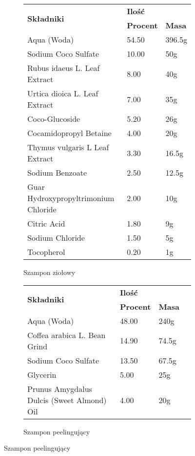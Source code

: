 {\renewcommand{\figurename}{\textbf{Tabela}}
\begin{figure}[H]
\centering
	\caption{(a) i (b) składy poszczególnych szamponów. (c), (d) i (e) składy poszczególnych odżywek}
\begin{footnotesize}
	\begin{subfigure}[t]{0.45\textwidth}
		\centering
		\caption{Szampon ziołowy}
		\begin{tabular}{p{}ll}
			\hline
			\multirow{2}{*}{\textbf{Składniki}} & \multicolumn{2}{l}{\textbf{Ilość}} \\
			\cline{2-3}
			& \textbf{Procent} & \textbf{Masa} \\
			\hline\hline
			Aqua (Woda) & 54.50 & 396.5g  \\
			Sodium Coco Sulfate & 10.00 & 50g  \\
			Rubus idaeus L. Leaf Extract & 8.00 & 40g  \\
			Urtica dioica L. Leaf Extract & 7.00 & 35g  \\
			Coco-Glucoside & 5.20 & 26g  \\
			Cocamidopropyl Betaine & 4.00 & 20g  \\
			Thymus vulgaris L Leaf Extract & 3.30 & 16.5g  \\
			Sodium Benzoate & 2.50 & 12.5g  \\
			Guar Hydroxypropyltrimonium Chloride & 2.00 & 10g  \\
			Citric Acid & 1.80 & 9g  \\
			Sodium Chloride & 1.50 & 5g  \\
			Tocopherol & 0.20 & 1g  \\
			\hline
		\end{tabular}
	\end{subfigure}
	\begin{subfigure}[t]{0.5\textwidth}
		\centering
		\caption{Szampon peelingujący}
		\begin{tabular}{p{}lll}
			\hline
			\multirow{2}{*}{\textbf{Składniki}} & \multicolumn{2}{l}{\textbf{Ilość}} \\
			\cline{2-3}
			& \textbf{Procent} & \textbf{Masa}  \\
			\hline\hline
			Aqua (Woda) & 48.00 & 240g  \\
			Coffea arabica L. Bean Grind & 14.90 & 74.5g  \\
			Sodium Coco Sulfate & 13.50 & 67.5g  \\
			Glycerin & 5.00 & 25g  \\
			Prunus Amygdalus Dulcis (Sweet Almond) Oil & 4.00 & 20g  \\

\end{tabular}
\end{subfigure}
\end{footnotesize}
\end{figure}}
